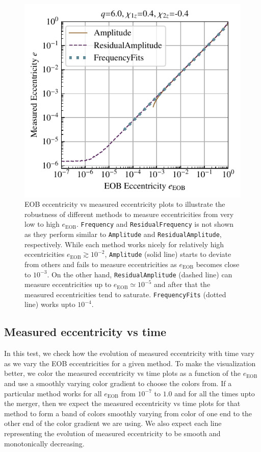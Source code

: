 \documentclass[aps,prd,amsmath,floats,floatfix, twocolumn,
superscriptaddress,nofootinbib,showpacs]{revtex4-1}
\newcommand{\eEOB}{e_{\text{EOB}}}
\newcommand{\mAmp}{\texttt{Amplitude}}
\newcommand{\mFreq}{\texttt{Frequency}}
\newcommand{\mResAmp}{\texttt{ResidualAmplitude}}
\newcommand{\mResFreq}{\texttt{ResidualFrequency}}
\newcommand{\mFreqFits}{\texttt{FrequencyFits}}
\begin{document}
\begin{figure}[thb]
\includegraphics[width=\columnwidth]{test_eob_vs_measured_ecc_example}
\caption{
  EOB eccentricity vs measured eccentricity plots to illustrate the
robustness of different methods to measure eccentricities from very
low to high $\eEOB$. \mFreq{} and \mResFreq{} is not shown as they
perform similar to \mAmp{} and \mResAmp{}, respectively.  While each
method works nicely for relatively high eccentricities $\eEOB \gtrsim
10^{-2}$, \mAmp{} (solid line) starts to deviate from others and fails
to measure eccentricities as $\eEOB$ becomes close to $10^{-3}$. On
the other hand, \mResAmp{} (dashed line) can measure eccentricities up
to $\eEOB \simeq 10^{-5}$ and after that the measured eccentricities
tend to saturate. \mFreqFits{} (dotted line) works upto $10^{-4}$.
}
\label{fig:eob_vs_measured_ecc}
\end{figure}

\subsection{Measured eccentricity vs time}
\label{sec:measured-eccentricity-vs-time}
In this test, we check how the evolution of measured eccentricity with
time vary as we vary the EOB eccentricities for a given method. To
make the visualization better, we color the measured eccentricity vs
time plots as a function of the $\eEOB$ and use a smoothly
varying color gradient to choose the colors from. If a particular
method works for all $\eEOB$ from $10^{-7}$ to $1.0$ and for
all the times upto the merger, then we expect the measured
eccentricity vs time plots for that method to form a band of colors
smoothly varying from color of one end to the other end of the color
gradient we are using. We also expect each line representing the
evolution of measured eccentricity to be smooth and monotonically
decreasing.
\end{document}
